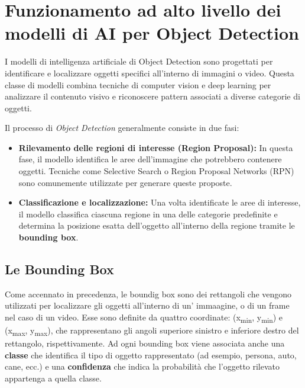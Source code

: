 \section{Funzionamento ad alto livello dei modelli di AI per Object Detection}


I modelli di intelligenza artificiale di Object Detection sono progettati per
identificare e localizzare oggetti specifici all'interno di immagini o video.
Questa classe di modelli combina tecniche di computer vision e deep learning per
analizzare il contenuto visivo e riconoscere pattern associati a diverse categorie
di oggetti.


Il processo di  \textit{Object Detection} generalmente consiste in due fasi:
\begin{itemize}
   \item \textbf{Rilevamento delle regioni di interesse (Region Proposal):} In questa fase, il modello identifica le aree dell'immagine che potrebbero contenere oggetti. Tecniche come Selective Search o Region Proposal Networks (RPN) sono comunemente utilizzate per generare queste proposte.
  
   \item \textbf{Classificazione e localizzazione:} Una volta identificate le aree di interesse, il modello classifica ciascuna regione in una delle categorie predefinite e determina la posizione esatta dell'oggetto all'interno della regione tramite le \textbf{bounding box}.
\end{itemize}




\subsection{Le Bounding Box}


Come accennato in precedenza, le boundig box sono dei rettangoli che vengono
utilizzati per localizzare gli oggetti all'interno di un' immaagine, o di un frame
nel caso di un video.
Esse sono definite da quattro coordinate: (x\textsubscript{min}, y\textsubscript{min})
e (x\textsubscript{max}, y\textsubscript{max}), che rappresentano gli angoli superiore
sinistro e inferiore destro del rettangolo, rispettivamente. Ad ogni bounding box
viene associata anche una \textbf{classe} che identifica il tipo di oggetto
rappresentato (ad esempio, persona, auto, cane, ecc.) e una \textbf{confidenza}
che indica la probabilità che l'oggetto rilevato appartenga a quella classe.


